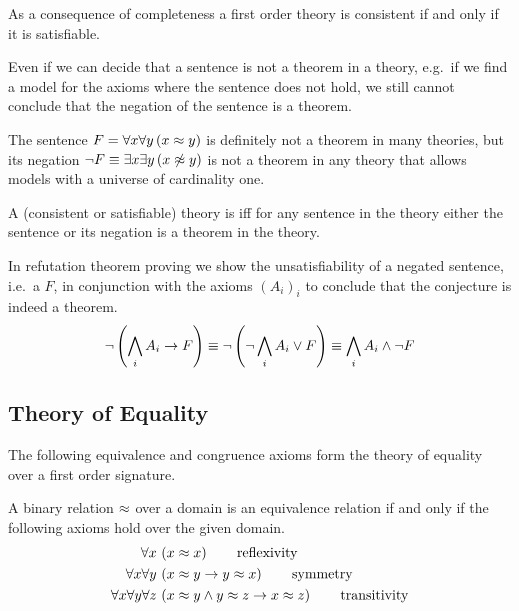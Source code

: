 \begin{lemma}
	As a consequence of completeness a first order theory 
	is consistent if and only if it is satisfiable.
\end{lemma}
%
Even if we can decide that a sentence is not a theorem in a theory,
e.g.~if we find a model for the axioms where the sentence does not hold,
we still cannot conclude that the negation of the sentence is a theorem.
\begin{example}
	The sentence \( F = \forall x \forall y\, (x\approx y) \) is definitely not a theorem in many theories, but its negation \( \lnot F \equiv \exists x \exists y\, (x \not\approx y) \) is not a theorem in any theory that allows models with a universe of cardinality one.
\end{example}
\begin{definition}\label{def:complete:theory}
	A (consistent or satisfiable) theory is  iff for any sentence in the theory either the sentence or its negation is a theorem in the theory.
\end{definition}
%
\begin{remark}
In refutation theorem proving
we show the unsatisfiability
of a negated sentence,
i.e.~a  \( F \),
in conjunction with the axioms \( ( A_i )_i \)
to conclude that the conjecture is indeed a theorem.
\[
	\lnot\left(\bigwedge_i A_i \rightarrow F \right) 
	\equiv
	\lnot\left( \lnot\bigwedge_i A_i \lor F \right) 
	\equiv
	\bigwedge_i A_i \land \lnot F
\]
\end{remark}

\subsection{Theory of Equality}

The following equivalence and congruence axioms form the theory of equality over a first order signature.

\begin{definition}
	[Equivalence] A binary relation \( \approx \) over a domain
	is an equivalence relation if and only if the following axioms hold over the given domain.\label{def:equivalence:axioms}
\begin{align*}
\forall x\,
&\left(x \approx x\right)
\tag*{reflexivity}
\\
\forall x \forall y\,
&\left(x \approx y \rightarrow y \approx x \right)
\tag*{symmetry}
\\
\forall x \forall y \forall z\,
&\left(x \approx y \land y\approx z \rightarrow x\approx z\right)
\tag*{transitivity}
\end{align*}
\end{definition}

